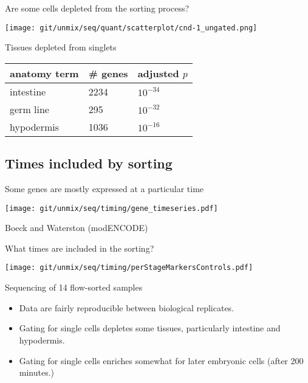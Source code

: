\documentclass[serif,9pt]{beamer}
\begin{document}
\begin{frame}{Are some cells depleted from the sorting process?}

\begin{minipage}{0.58\textwidth}
\texttt{[image: git/unmix/seq/quant/scatterplot/cnd-1\_ungated.png]}
\end{minipage}
\pause
\begin{minipage}{0.4\textwidth}
Tissues depleted from singlets
\begin{table}[!tbp]\scriptsize
\begin{tabular}{lll}
anatomy term & \# genes & adjusted $p$ \\
\hline
intestine & 2234 & $10^{-34}$ \\
germ line & 295 & $10^{-32}$ \\
hypodermis & 1036 & $10^{-16}$ \\
\end{tabular}
\end{table}
\end{minipage}

\end{frame}

\subsection{Times included by sorting}

\begin{frame}{Some genes are mostly expressed at a particular time}

\texttt{[image: git/unmix/seq/timing/gene\_timeseries.pdf]}

\hfill Boeck and Waterston (modENCODE)

\end{frame}

\begin{frame}{What times are included in the sorting?}

\begin{centering}
\texttt{[image: git/unmix/seq/timing/perStageMarkersControls.pdf]}
\end{centering}

\end{frame}

\begin{frame}{Sequencing of 14 flow-sorted samples}

\begin{itemize}

\item Data are fairly reproducible between biological replicates.

\item Gating for single cells depletes some tissues, particularly
intestine and hypodermis.

\item Gating for single cells enriches somewhat for later embryonic
cells (after 200 minutes.)

\end{itemize}

\end{frame}
\end{document}
